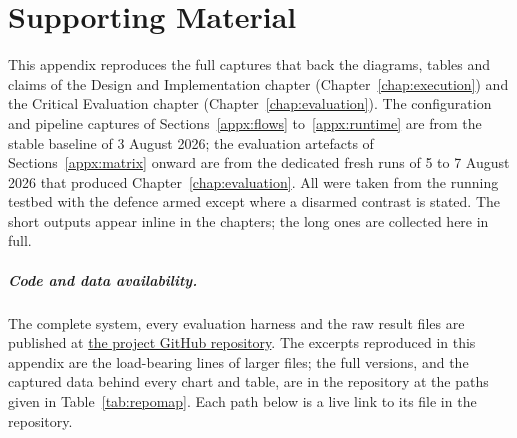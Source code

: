 \chapter{Supporting Material}
\label{appx:material}

This appendix reproduces the full captures that back the diagrams, tables and claims of the Design and Implementation chapter (Chapter~\ref{chap:execution}) and the Critical Evaluation chapter (Chapter~\ref{chap:evaluation}). The configuration and pipeline captures of Sections~\ref{appx:flows} to~\ref{appx:runtime} are from the stable baseline of 3 August 2026; the evaluation artefacts of Sections~\ref{appx:matrix} onward are from the dedicated fresh runs of 5 to 7 August 2026 that produced Chapter~\ref{chap:evaluation}. All were taken from the running testbed with the defence armed except where a disarmed contrast is stated. The short outputs appear inline in the chapters; the long ones are collected here in full.

\paragraph{Code and data availability.} The complete system, every evaluation harness and the raw result files are published at \href{\repourl}{the project GitHub repository}. The excerpts reproduced in this appendix are the load-bearing lines of larger files; the full versions, and the captured data behind every chart and table, are in the repository at the paths given in Table~\ref{tab:repomap}. Each path below is a live link to its file in the repository.

